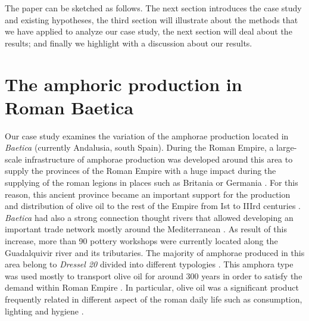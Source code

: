 \documentclass[review]{elsarticle}
\begin{document}
The paper can be sketched as follows. The next section introduces the case study and existing hypotheses, the third section will illustrate about the methods that we have applied to analyze our case study, the next section will deal about the results; and finally we highlight with a discussion about our results.  


\section{The amphoric production in Roman Baetica}

Our case study examines the variation of the amphorae production located in \emph{Baetica} (currently Andalusia, south Spain). During the Roman Empire, a large-scale infrastructure of amphorae production was developed around this area to supply the provinces of the Roman Empire with a huge impact during the supplying of the roman legions in places such as Britania \citep{funari_economic_2005, monfort_britannia_1998} or Germania \citep{remesal_annona_1986}. For this reason, this ancient province became an important support for the production and distribution of olive oil to the rest of the Empire from Ist to IIIrd centuries \cite{chic_comercio_2005,millet_anforas_1998, rodriguez_baetican_1998}. \emph{Baetica} had also a strong connection thought rivers that allowed developing an important trade network mostly around the Mediterranean \citep{garcia_vargas_enrique_formal_2010}. As result of this increase, more than 90 pottery workshops were currently located along the Guadalquivir river and its tributaries. The majority of amphorae produced in this area belong to \emph{Dressel 20} divided into different typologies \citep{berni_millet_epigrafianforica_2008, martin-kilcher_romischen_1994}. This amphora type was used mostly to transport olive oil for around 300 years in order to satisfy the demand within Roman Empire \citep{rodriguez_economioleicola_1977}. In particular, olive oil was a significant product frequently related in different aspect of the roman daily life such as consumption, lighting and hygiene \citep{mattingly_d.j._oil_1988}. 
\end{document}
